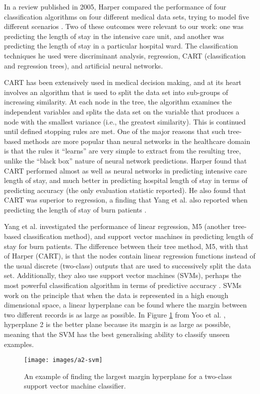 In a review published in 2005, Harper compared the performance of four
classification algorithms on four different medical data sets, trying to
model five different scenarios \citep{Harper2005}. Two of these outcomes were
relevant to our work: one was predicting the length of stay in the intensive
care unit, and another was predicting the length of stay in a particular
hospital ward. The classification techniques he used were discriminant
analysis, regression, CART (classification and regression trees),
and artificial neural networks.

CART has been extensively used in medical decision making, and at its heart
involves an algorithm that is used to split the data set into sub-groups of
increasing similarity. At each node in the tree, the algorithm examines the
independent variables and splits the data set on the variable that produces
a node with the smallest variance (i.e., the greatest similarity). This is
continued until defined stopping rules are met. One of the major reasons that
such tree-based methods are more popular than neural networks in the
healthcare domain is that the rules it ``learns'' are very simple to extract
from the resulting tree, unlike the ``black box'' nature of neural network
predictions.
Harper found that CART performed almost as well as neural networks in
predicting intensive care length of stay, and much better in predicting
hospital length of stay in terms of predicting accuracy (the only evaluation
statistic reported). He also found that CART was superior to regression, a
finding that Yang et al. also reported when predicting the length of stay of
burn patients \citep{Yang2010}.

Yang et al. investigated the performance of linear regression, M5 (another
tree-based classification method), and support vector machines in predicting
length of stay for burn patients. The difference between their tree method,
M5, with that of Harper (CART), is that the nodes contain linear regression
functions instead of the usual discrete (two-class) outputs that are used to
successively split the data set. Additionally, they also use support vector
machines (SVMs), perhaps the most powerful classification algorithm in terms of
predictive accuracy \citep{Bellazzi2008}. SVMs work on the principle that when
the data is represented in a high enough dimensional space, a linear hyperplane
can be found where the margin between two different records is as large as
possible. In Figure \ref{fig:svm-example} from Yoo et al. \citep{Yoo2012},
hyperplane 2 is the better plane because its margin is as large as possible,
meaning that the SVM has the best generalising ability to classify unseen
examples.
\begin{figure}[h]
\centering
\texttt{[image: images/a2-svm]}
\caption{An example of finding the largest margin hyperplane for a two-class
support vector machine classifier.}
\label{fig:svm-example}
\end{figure}

